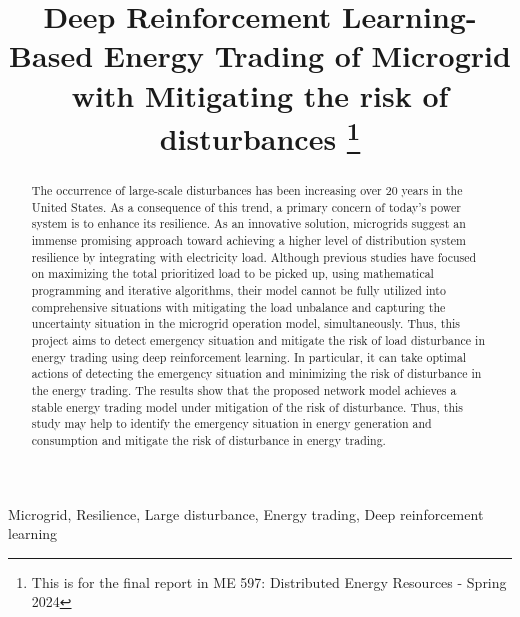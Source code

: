 \documentclass[conference]{IEEEtran}
\begin{document}
\title{Deep Reinforcement Learning-Based Energy Trading of Microgrid with Mitigating the risk of disturbances 
\thanks{This is for the final report in ME 597: Distributed Energy Resources - Spring 2024 }
}

\author{

}

\maketitle

\begin{abstract}
The occurrence of large-scale disturbances has been increasing over 20 years in the United States. As a consequence of this trend, a primary concern of today's power system is to enhance its resilience. As an innovative solution, microgrids suggest an immense promising approach toward achieving a higher level of distribution system resilience by integrating with electricity load. Although previous studies have focused on maximizing the total prioritized load to be picked up, using mathematical programming and iterative algorithms, their model cannot be fully utilized into comprehensive situations with mitigating the load unbalance and capturing the uncertainty situation in the microgrid operation model, simultaneously. Thus, this project aims to detect emergency situation and mitigate the risk of load disturbance in energy trading using deep reinforcement learning. In particular, it can take optimal actions of detecting the emergency situation and minimizing the risk of disturbance in the energy trading. The results show that the proposed network model achieves a stable energy trading model under mitigation of the risk of disturbance. Thus, this study may help to identify the emergency situation in energy generation and consumption and mitigate the risk of disturbance in energy trading. 
\end{abstract}

\begin{IEEEkeywords}
Microgrid, Resilience, Large disturbance, Energy trading, Deep reinforcement learning
\end{IEEEkeywords}
\end{document}
